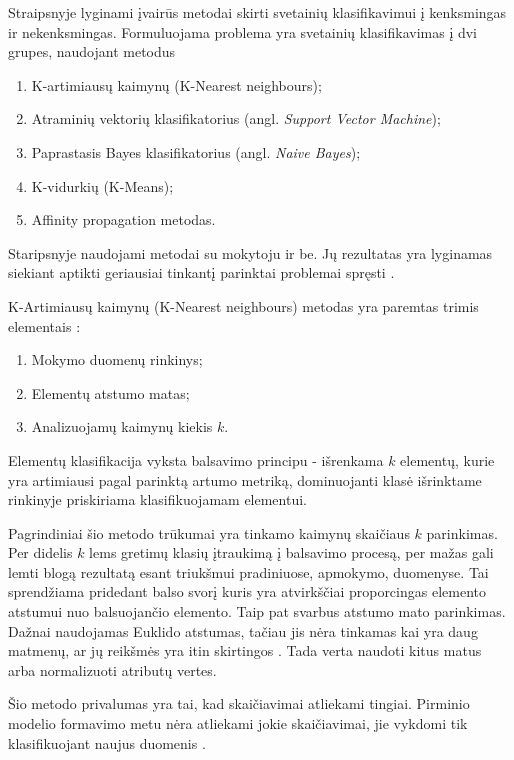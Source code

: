 

Straipsnyje lyginami įvairūs metodai skirti svetainių klasifikavimui į kenksmingas ir nekenksmingas. Formuluojama problema yra svetainių klasifikavimas į dvi grupes, naudojant metodus \cite{comp}
\begin{enumerate}
 \item K-artimiausų kaimynų (K-Nearest neighbours);
 \item Atraminių vektorių klasifikatorius (angl. \textit{Support Vector Machine});
 \item Paprastasis Bayes klasifikatorius (angl. \textit{Naive Bayes});
 \item K-vidurkių (K-Means);
 \item Affinity propagation metodas.
\end{enumerate}

Staripsnyje naudojami metodai su mokytoju ir be. Jų rezultatas yra lyginamas siekiant aptikti geriausiai tinkantį parinktai problemai spręsti \cite{comp}.

K-Artimiausų kaimynų (K-Nearest neighbours) metodas yra paremtas trimis elementais \cite{Wu2008}:
\begin{enumerate}
    \item Mokymo duomenų rinkinys;
    \item Elementų atstumo matas;
    \item Analizuojamų kaimynų kiekis $k$.
\end{enumerate}
Elementų klasifikacija vyksta balsavimo principu - išrenkama $k$ elementų, kurie yra artimiausi pagal parinktą artumo metriką, dominuojanti klasė išrinktame rinkinyje priskiriama klasifikuojamam elementui.

Pagrindiniai šio metodo trūkumai yra tinkamo kaimynų skaičiaus $k$ parinkimas. Per didelis $k$ lems gretimų klasių įtraukimą į balsavimo procesą, per mažas gali lemti blogą rezultatą esant triukšmui pradiniuose, apmokymo, duomenyse. Tai sprendžiama pridedant balso svorį \cite{Wu2008} kuris yra atvirkščiai proporcingas elemento atstumui nuo balsuojančio elemento. Taip pat svarbus atstumo mato parinkimas. Dažnai naudojamas Euklido atstumas, tačiau jis nėra tinkamas kai yra daug matmenų, ar jų reikšmės yra itin skirtingos \cite{Wu2008}. Tada verta naudoti kitus matus arba normalizuoti atributų vertes.

Šio metodo privalumas yra tai, kad skaičiavimai atliekami tingiai. Pirminio modelio formavimo metu nėra atliekami jokie skaičiavimai, jie vykdomi tik klasifikuojant naujus duomenis \cite{Wu2008}.

